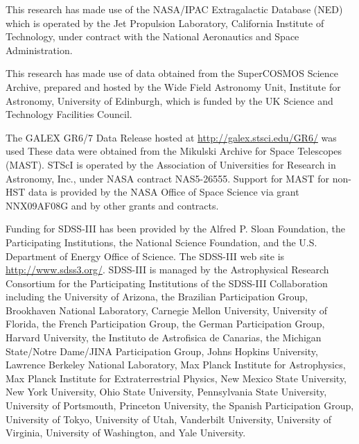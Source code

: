 \documentclass[11pt,a4paper]{article}
\begin{document}
This research has made use of the NASA/IPAC Extragalactic Database
(NED) which is operated by the Jet Propulsion Laboratory, California
Institute of Technology, under contract with the National Aeronautics
and Space Administration.

This research has made use of data obtained from the SuperCOSMOS
Science Archive, prepared and hosted by the Wide Field Astronomy Unit,
Institute for Astronomy, University of Edinburgh, which is funded by
the UK Science and Technology Facilities Council.

The GALEX GR6/7 Data Release hosted at \href{http://galex.stsci.edu/GR6/}{http://galex.stsci.edu/GR6/} was used These data were obtained from the Mikulski Archive for Space Telescopes (MAST). STScI is operated by the Association of Universities for Research in Astronomy, Inc., under NASA contract NAS5-26555. Support for MAST for non-HST data is provided by the NASA Office of Space Science via grant NNX09AF08G and by other grants and contracts. 

Funding for SDSS-III has been provided by the Alfred P. Sloan
Foundation, the Participating Institutions, the National Science
Foundation, and the U.S. Department of Energy Office of Science. The
SDSS-III web site is
\href{http://www.sdss3.org/}{http://www.sdss3.org/}.
SDSS-III is managed by the Astrophysical Research Consortium for the
Participating Institutions of the SDSS-III Collaboration including the
University of Arizona, the Brazilian Participation Group, Brookhaven
National Laboratory, Carnegie Mellon University, University of
Florida, the French Participation Group, the German Participation
Group, Harvard University, the Instituto de Astrofisica de Canarias,
the Michigan State/Notre Dame/JINA Participation Group, Johns Hopkins
University, Lawrence Berkeley National Laboratory, Max Planck
Institute for Astrophysics, Max Planck Institute for Extraterrestrial
Physics, New Mexico State University, New York University, Ohio State
University, Pennsylvania State University, University of Portsmouth,
Princeton University, the Spanish Participation Group, University of
Tokyo, University of Utah, Vanderbilt University, University of
Virginia, University of Washington, and Yale University.






\end{document}
